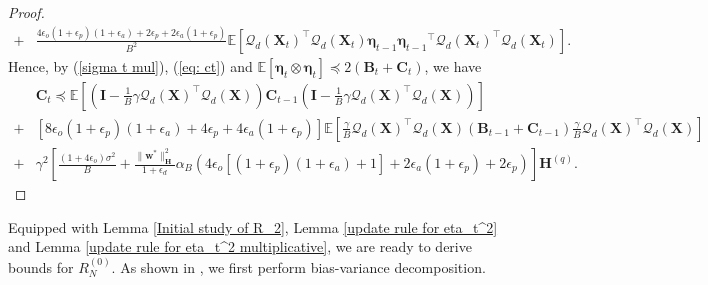 \documentclass[11pt, letterpaper]{article}
\begin{document}
\begin{proof}
\begin{equation}
\begin{aligned}
            +&\frac{4\epsilon_o(1+\epsilon_p)(1+\epsilon_a)+2\epsilon_p+2\epsilon_a(1+\epsilon_p)}{B^2}\mathbb{E}\left[{\mathcal{Q}_d(\mathbf{X}_t)}^\top {\mathcal{Q}_d(\mathbf{X}_t)}\boldsymbol{\eta}_{t-1}{\boldsymbol{\eta}_{t-1}}^\top{\mathcal{Q}_d(\mathbf{X}_t)}^\top\mathcal{Q}_d(\mathbf{X}_t)\right].
        \end{aligned}
    \end{equation}
    Hence, by (\ref{sigma t mul}), (\ref{eq: ct}) and $\mathbb{E}\left[\boldsymbol{\eta}_t\otimes\boldsymbol{\eta}_t\right] \preceq 2(\mathbf{B}_t+\mathbf{C}_t)$, we have
    \begin{equation*}
        \begin{aligned}
            &\mathbf{C}_t\preceq\mathbb{E}\left[\left(\mathbf{I}-\frac{1}{B}\gamma {\mathcal{Q}_d(\mathbf{X})}^\top \mathcal{Q}_d(\mathbf{X}) \right)\mathbf{C}_{t-1}\left(\mathbf{I}-\frac{1}{B}\gamma {\mathcal{Q}_d(\mathbf{X})}^\top \mathcal{Q}_d(\mathbf{X}) \right)\right]\\
            +&\left[8\epsilon_o(1+\epsilon_p)(1+\epsilon_a)+4\epsilon_p+4\epsilon_a(1+\epsilon_p)\right]\mathbb{E}\left[\frac{\gamma}{B}{\mathcal{Q}_d(\mathbf{X})}^\top {\mathcal{Q}_d(\mathbf{X})}(\mathbf{B}_{t-1}+\mathbf{C}_{t-1})\frac{\gamma}{B}{\mathcal{Q}_d(\mathbf{X})}^\top\mathcal{Q}_d(\mathbf{X})\right]\\
            +&\gamma^2 \left[\frac{(1+4\epsilon_o)\sigma^2}{B} + \frac{\|\mathbf{w}^*\|_\mathbf{H}^2}{1+\epsilon_d}\alpha_B\left(4\epsilon_o[(1+\epsilon_p)(1+\epsilon_a)+1]+2\epsilon_a(1+\epsilon_p)+2\epsilon_p \right)\right]\mathbf{H}^{(q)}.
        \end{aligned}
    \end{equation*}
\end{proof}

Equipped with Lemma \ref{Initial study of R_2}, Lemma \ref{update rule for eta_t^2} and Lemma \ref{update rule for eta_t^2 multiplicative}, we are ready to derive bounds for $R_N^{(0)}$. As shown in \citet{zou2023benign}, we first perform bias-variance decomposition.
\end{document}
